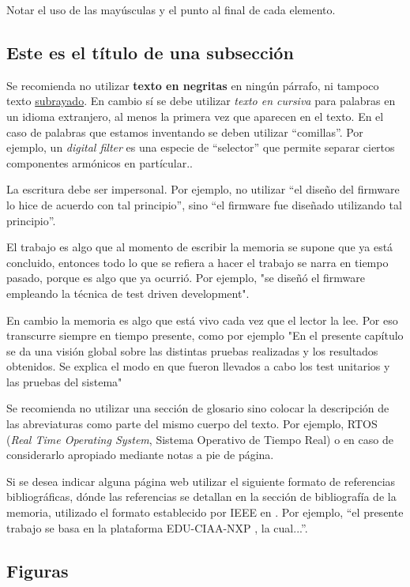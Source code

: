 Notar el uso de las mayúsculas y el punto al final de cada elemento.

\subsection{Este es el título de una subsección}
\label{subsec:ejemplo}

Se recomienda no utilizar \textbf{texto en negritas} en ningún párrafo, ni tampoco texto \underline{subrayado}. En cambio sí se debe utilizar \textit{texto en cursiva} para palabras en un idioma extranjero, al menos la primera vez que aparecen en el texto. En el caso de palabras que estamos inventando se deben utilizar ``comillas''. Por ejemplo, un \textit{digital filter} es una especie de ``selector'' que permite separar ciertos componentes armónicos en partícular..

La escritura debe ser impersonal. Por ejemplo, no utilizar ``el diseño del firmware lo hice de acuerdo con tal principio'', sino ``el firmware fue diseñado utilizando tal principio''. 

El trabajo es algo que al momento de escribir la memoria se supone que ya está concluido, entonces todo lo que se refiera a hacer el trabajo se narra en tiempo pasado, porque es algo que ya ocurrió. Por ejemplo, "se diseñó el firmware empleando la técnica de test driven development".

En cambio la memoria es algo que está vivo cada vez que el lector la lee. Por eso transcurre siempre en tiempo presente, como por ejemplo "En el presente capítulo se da una visión global sobre las distintas pruebas realizadas y los resultados obtenidos. Se explica el modo en que fueron llevados a cabo los test unitarios y las pruebas del sistema"

Se recomienda no utilizar una sección de glosario sino colocar la descripción de las abreviaturas como parte del mismo cuerpo del texto. Por ejemplo, RTOS (\textit{Real Time Operating System}, Sistema Operativo de Tiempo Real) o en caso de considerarlo apropiado mediante notas a pie de página.

Si se desea indicar alguna página web utilizar el siguiente formato de referencias bibliográficas, dónde las referencias se detallan en la sección de bibliografía de la memoria, utilizado el formato establecido por IEEE en \citep{IEEE:citation}. Por ejemplo, ``el presente trabajo se basa en la plataforma EDU-CIAA-NXP \citep{CIAA}, la cual...''.

\subsection{Figuras} 

